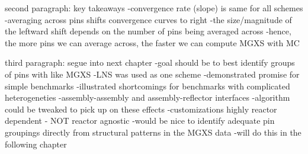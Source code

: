 second paragraph: key takeaways
-convergence rate (slope) is same for all schemes
-averaging across pins shifts convergence curves to right
-the size/magnitude of the leftward shift depends on the number of pins being averaged across
-hence, the more pins we can average across, the faster we can compute \ac{MGXS} with \ac{MC}

third paragraph: segue into next chapter
-goal should be to best identify groups of pins with like \ac{MGXS}
-\ac{LNS} was used as one scheme
  -demonstrated promise for simple benchmarks
  -illustrated shortcomings for benchmarks with complicated heterogeneties
    -assembly-assembly and assembly-reflector interfaces
  -algorithm could be tweaked to pick up on these effects
    -customizations highly reactor dependent - NOT reactor agnostic
-would be nice to identify adequate pin groupings directly from structural patterns in the \ac{MGXS} data
-will do this in the following chapter

